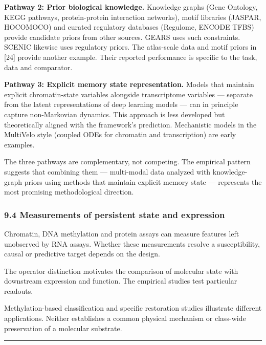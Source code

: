\documentclass[
]{article}
\begin{document}
\textbf{Pathway 2: Prior biological knowledge.} Knowledge graphs (Gene
Ontology, KEGG pathways, protein-protein interaction networks), motif
libraries (JASPAR, HOCOMOCO) and curated regulatory databases (Regulome,
ENCODE TFBS) provide candidate priors from other sources. GEARS uses
such constraints. SCENIC likewise uses regulatory priors. The
atlas-scale data and motif priors in {[}24{]} provide another example.
Their reported performance is specific to the task, data and comparator.

\textbf{Pathway 3: Explicit memory state representation.} Models that
maintain explicit chromatin-state variables alongside transcriptome
variables --- separate from the latent representations of deep learning
models --- can in principle capture non-Markovian dynamics. This
approach is less developed but theoretically aligned with the
framework's prediction. Mechanistic models in the MultiVelo style
(coupled ODEs for chromatin and transcription) are early examples.

The three pathways are complementary, not competing. The empirical
pattern suggests that combining them --- multi-modal data analyzed with
knowledge-graph priors using methods that maintain explicit memory state
--- represents the most promising methodological direction.

\hypertarget{measurements-of-persistent-state-and-expression}{%
\subsubsection{9.4 Measurements of persistent state and
expression}\label{measurements-of-persistent-state-and-expression}}

Chromatin, DNA methylation and protein assays can measure features left
unobserved by RNA assays. Whether these measurements resolve a
susceptibility, causal or predictive target depends on the design.

The operator distinction motivates the comparison of molecular state
with downstream expression and function. The empirical studies test
particular readouts.

Methylation-based classification and specific restoration studies
illustrate different applications. Neither establishes a common physical
mechanism or class-wide preservation of a molecular substrate.

\begin{center}\rule{0.5\linewidth}{0.5pt}\end{center}
\end{document}
